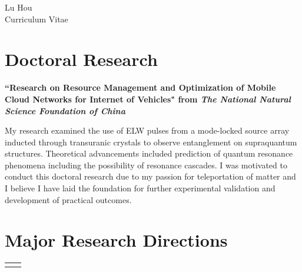 \documentclass[10pt]{article} %
\begin{document}
\begin{paracol}{2} %


\parbox[top][0.12\textheight][c]{\linewidth}{ %
	\vspace{-0.04\textheight} %
	\centering %
	{\Huge Lu Hou}\hspace{1pt} \faMars\\\medskip %
	{\Huge\color{headings}\cvtextfont Curriculum Vitae}
}


\section{Doctoral Research}

{\raggedright\textbf{``Research on Resource Management and Optimization of Mobile Cloud Networks for Internet of Vehicles" from \textit{The National Natural Science Foundation of China}}\\\medskip}

My research examined the use of ELW pulses from a mode-locked source array inducted through transuranic crystals to observe entanglement on supraquantum structures. Theoretical advancements included prediction of quantum resonance phenomena including the possibility of resonance cascades. I was motivated to conduct this doctoral research due to my passion for teleportation of matter and I believe I have laid the foundation for further experimental validation and development of practical outcomes.

\medskip %

\section{Major Research Directions}
	\begin{supertabular}{rl}
	\end{supertabular}


\end{paracol}
\end{document}
